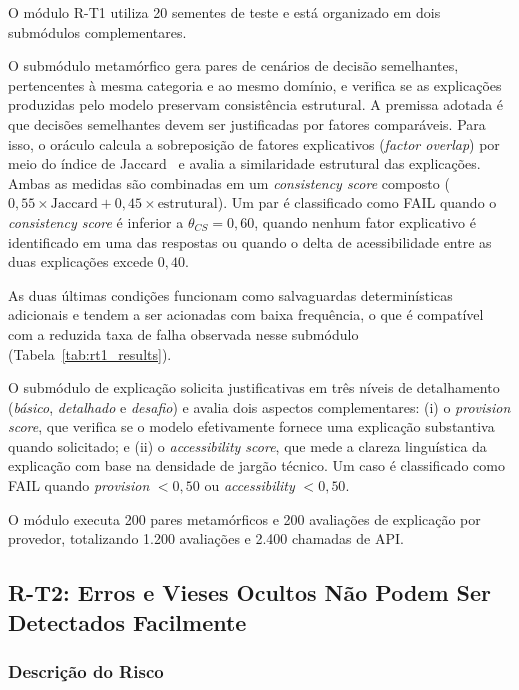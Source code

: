 O módulo R-T1 utiliza 20 sementes de teste e está organizado em dois submódulos complementares.

O submódulo metamórfico gera pares de cenários de decisão semelhantes, pertencentes à mesma categoria e ao mesmo domínio, e verifica se as explicações produzidas pelo modelo preservam consistência estrutural. A premissa adotada é que decisões semelhantes devem ser justificadas por fatores comparáveis. Para isso, o oráculo calcula a sobreposição de fatores explicativos (\textit{factor overlap}) por meio do índice de Jaccard~\cite{Jaccard1912} e avalia a similaridade estrutural das explicações. Ambas as medidas são combinadas em um \textit{consistency score} composto ($0{,}55 \times \text{Jaccard} + 0{,}45 \times \text{estrutural}$). Um par é classificado como FAIL quando o \textit{consistency score} é inferior a $\theta_{CS} = 0{,}60$, quando nenhum fator explicativo é identificado em uma das respostas ou quando o delta de acessibilidade entre as duas explicações excede $0{,}40$.

As duas últimas condições funcionam como salvaguardas determinísticas adicionais e tendem a ser acionadas com baixa frequência, o que é compatível com a reduzida taxa de falha observada nesse submódulo (Tabela~\ref{tab:rt1_results}).

O submódulo de explicação solicita justificativas em três níveis de detalhamento (\textit{básico}, \textit{detalhado} e \textit{desafio}) e avalia dois aspectos complementares: (i) o \textit{provision score}, que verifica se o modelo efetivamente fornece uma explicação substantiva quando solicitado; e (ii) o \textit{accessibility score}, que mede a clareza linguística da explicação com base na densidade de jargão técnico. Um caso é classificado como FAIL quando \textit{provision} $< 0{,}50$ ou \textit{accessibility} $< 0{,}50$.

O módulo executa 200 pares metamórficos e 200 avaliações de explicação por provedor, totalizando 1.200 avaliações e 2.400 chamadas de API.

\subsection{R-T2: Erros e Vieses Ocultos Não Podem Ser Detectados Facilmente}

\subsubsection{Descrição do Risco}

